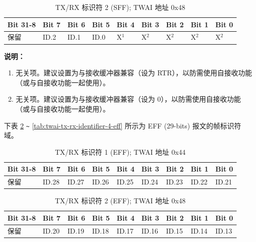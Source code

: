 \documentclass[main\_\_CN.tex]{subfiles}
\begin{document}
\begin{longtable}[c]{|p{1.4cm}|p{1.4cm}|p{1.4cm}|p{1.4cm}|p{1.4cm}|p{1.4cm}|p{1.4cm}|p{1.4cm}|p{1.4cm}|}
    \caption{TX/RX 标识符 2 (SFF); TWAI 地址 0x48}
    \label{tab:twai-tx-rx-identifier-2-sff}\\
    \hline
       \rowcolor{lightgray}
    \textbf{Bit 31-8} & \textbf{Bit 7} & \textbf{Bit 6} & \textbf{Bit 5} & \textbf{Bit 4} & \textbf{Bit 3} & \textbf{Bit 2} & \textbf{Bit 1} & \textbf{Bit 0}\\\hline
    保留 & ID.2 & ID.1 & ID.0 & X$^1$ & X$^2$ & X$^2$ & X$^2$ & X$^2$\\
    \hline
\end{longtable}
\vspace{-1.5em}
{\bfseries 说明：}\\
\begin{enumerate}
    \item 无关项。建议设置为与接收缓冲器兼容（设为 RTR），以防需使用自接收功能（或与自接收功能一起使用）。
    \item 无关项。建议设置为与接收缓冲器兼容（设为 0），以防需使用自接收功能（或与自接收功能一起使用）。
\end{enumerate}

下表 \ref{tab:twai-tx-rx-identifier-1-eff} \verb+~+ \ref{tab:twai-tx-rx-identifier-4-eff} 所示为 EFF (29-bits) 报文的帧标识符域。

\begin{longtable}[c]{|p{1.4cm}|p{1.4cm}|p{1.4cm}|p{1.4cm}|p{1.4cm}|p{1.4cm}|p{1.4cm}|p{1.4cm}|p{1.4cm}|}
    \caption{TX/RX 标识符 1 (EFF); TWAI 地址 0x44}
    \label{tab:twai-tx-rx-identifier-1-eff}\\
    \hline
       \rowcolor{lightgray}
    \textbf{Bit 31-8} & \textbf{Bit 7} & \textbf{Bit 6} & \textbf{Bit 5} & \textbf{Bit 4} & \textbf{Bit 3} & \textbf{Bit 2} & \textbf{Bit 1} & \textbf{Bit 0}\\\hline
    保留 & ID.28 & ID.27 & ID.26 & ID.25 & ID.24 & ID.23 & ID.22 & ID.21\\
    \hline
\end{longtable}

\begin{longtable}[c]{|p{1.4cm}|p{1.4cm}|p{1.4cm}|p{1.4cm}|p{1.4cm}|p{1.4cm}|p{1.4cm}|p{1.4cm}|p{1.4cm}|}
    \caption{TX/RX 标识符 2 (EFF); TWAI 地址 0x48}
    \label{tab:twai-tx-rx-identifier-2-eff}\\
    \hline
       \rowcolor{lightgray}
    \textbf{Bit 31-8} & \textbf{Bit 7} & \textbf{Bit 6} & \textbf{Bit 5} & \textbf{Bit 4} & \textbf{Bit 3} & \textbf{Bit 2} & \textbf{Bit 1} & \textbf{Bit 0}\\\hline
    保留 & ID.20 & ID.19 & ID.18 & ID.17 & ID.16 & ID.15 & ID.14 & ID.13\\
    \hline
\end{longtable}
\end{document}

